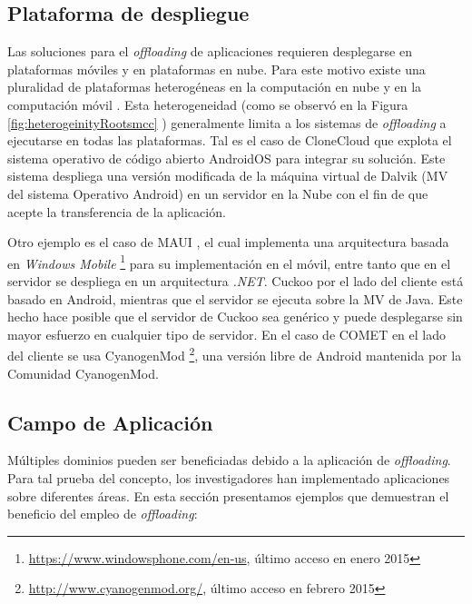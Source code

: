 \subsection{Plataforma de despliegue}
 
 Las soluciones para el \emph{offloading} de aplicaciones requieren desplegarse en plataformas móviles y en plataformas en nube. Para este motivo
 existe una pluralidad de plataformas heterogéneas en la computación en nube y en la computación móvil . 
 Esta heterogeneidad (como se observó en la Figura \ref{fig:heterogeinityRootsmcc} ) generalmente limita a los sistemas de
 \emph{offloading} a ejecutarse en todas las plataformas. Tal es el caso de 
 CloneCloud \cite{chun2011clonecloud} que explota el sistema operativo de código abierto AndroidOS
 para integrar su solución. Este sistema despliega una versión modificada de la máquina virtual de Dalvik (MV del sistema 
 Operativo Android) \cite{ehringer2010dalvik} en un servidor en la Nube con el fin de que acepte la transferencia de la aplicación.
 
 Otro ejemplo es el caso de MAUI \cite{Cuervo:2010:MMS:1814433.1814441}, el cual implementa una arquitectura basada en \emph{Windows Mobile}
 \footnote{\url{https://www.windowsphone.com/en-us}, último acceso en enero 2015}
 para su implementación  en el móvil, entre tanto que en el servidor  se despliega en un arquitectura \emph{.NET}. Cuckoo \cite{kemp2012cuckoo}
 por el lado del cliente está basado en Android, mientras que el servidor se ejecuta sobre la MV de Java. Este hecho hace posible que el 
 servidor de Cuckoo sea genérico y puede desplegarse sin mayor esfuerzo en cualquier tipo de servidor. En el caso de COMET \cite{gordon2012comet}
 en el lado del cliente se usa CyanogenMod \footnote{\url{http://www.cyanogenmod.org/}, último acceso en febrero 2015},
 una versión libre de Android mantenida por la Comunidad CyanogenMod.
 
 \subsection{Campo de Aplicación}
 
 Múltiples dominios pueden ser beneficiadas debido a la aplicación de \textit{offloading}. Para tal prueba del concepto, 
 los investigadores han 
 implementado aplicaciones sobre diferentes áreas. En esta sección presentamos ejemplos que demuestran el beneficio del empleo de 
 \textit{offloading}: 
 
